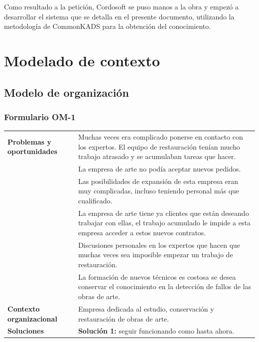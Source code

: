 \documentclass[a4paper,11pt]{article}
\begin{document}
	Como resultado a la petición, Cordosoft se puso manos a la obra y empezó a
	desarrollar el sistema que se detalla en el presente documento, utilizando la
	metodología de CommonKADS para la obtención del conocimiento.
	
	\newpage
	\section{Modelado de contexto}
		\subsection{Modelo de organización}
			\subsubsection{Formulario OM-1}
			\begin{center}
				\begin{tabular}{| p{2.9cm} | p{8.5cm} |}
					\hline
					\cellcolor[RGB]{224,233,250}\textbf{Problemas y oportunidades} &
					Muchas veces era complicado ponerse en contacto con los expertos. El equipo
					de restauración tenían mucho trabajo atrasado y se acumulaban tareas que hacer.\\
					\cellcolor[RGB]{224,233,250}& La empresa de arte no podía aceptar nuevos
					pedidos.\\
					\cellcolor[RGB]{224,233,250}& Las posibilidades de expansión de esta
					empresa eran muy complicadas, incluso teniendo personal más que cualificado.\\
					\cellcolor[RGB]{224,233,250}& La empresa de arte tiene ya clientes que
					están deseando trabajar con ellas, el trabajo acumulado le impide a esta empresa acceder a estos nuevos
					contratos.\\
					\cellcolor[RGB]{224,233,250}& Discusiones personales en los expertos que
					hacen que muchas veces sea imposible empezar un trabajo de restauración.\\
					\cellcolor[RGB]{224,233,250}& La formación de nuevos técnicos es costosa se
					desea conservar el conocimiento en la detección de fallos de las obras de arte.\\
					\hline
					\cellcolor[RGB]{224,233,250}\textbf{Contexto organizacional} &
					Empresa dedicada al estudio, conservación y restauración de obras de arte.\\
					\hline
					\cellcolor[RGB]{224,233,250}\textbf{Soluciones} & \textbf{Solución 1:}
					seguir funcionando como hasta ahora.\\

\end{tabular}
\end{center}
\end{document}
